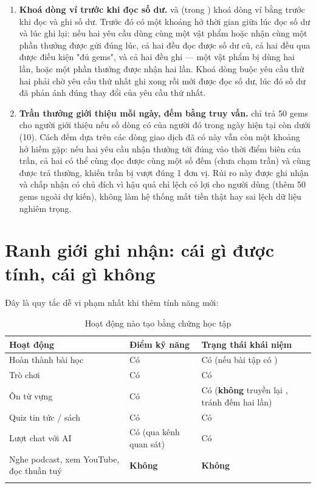 \begin{enumerate}[leftmargin=1.4em]
  \item \textbf{Khoá dòng ví trước khi đọc số dư.}  và 
  (trong ) khoá dòng ví bằng  trước khi đọc
  và ghi số dư. Trước đó có một khoảng hở thời gian giữa lúc đọc số dư và lúc ghi lại: nếu
  hai yêu cầu dùng cùng một vật phẩm hoặc nhận cùng một phần thưởng được gửi đúng lúc, cả
  hai đều đọc được số dư cũ, cả hai đều qua được điều kiện "đủ gems", và cả hai đều ghi —
  một vật phẩm bị dùng hai lần, hoặc một phần thưởng được nhận hai lần. Khoá dòng buộc yêu
  cầu thứ hai phải chờ yêu cầu thứ nhất ghi xong rồi mới được đọc số dư, lúc đó số dư đã
  phản ánh đúng thay đổi của yêu cầu thứ nhất.
  \item \textbf{Trần thưởng giới thiệu mỗi ngày, đếm bằng truy vấn.} 
  chỉ trả 50 gems cho người giới thiệu nếu số dòng  có
   của người đó trong ngày hiện tại còn dưới
   (10). Cách đếm dựa trên các dòng giao dịch đã
  có này vẫn còn một khoảng hở hiếm gặp: nếu hai yêu cầu nhận thưởng tới đúng vào thời điểm
  biên của trần, cả hai có thể cùng đọc được cùng một số đếm (chưa chạm trần) và cùng được
  trả thưởng, khiến trần bị vượt đúng 1 đơn vị. Rủi ro này được ghi nhận và chấp nhận có
  chủ đích vì hậu quả chỉ lệch có lợi cho người dùng (thêm 50 gems ngoài dự kiến), không
  làm hệ thống mất tiền thật hay sai lệch dữ liệu nghiêm trọng.
\end{enumerate}

\section{Ranh giới ghi nhận: cái gì được tính, cái gì không}

Đây là quy tắc dễ vi phạm nhất khi thêm tính năng mới:

\begin{longtable}{L{5.0cm} L{4.2cm} L{4.4cm}}
\toprule
\textbf{Hoạt động} & \textbf{Điểm kỹ năng} & \textbf{Trạng thái khái niệm}\\
\midrule
\endhead
Hoàn thành bài học & Có & Có (nếu bài tập có )\\
Trò chơi & Có & Có\\
Ôn từ vựng & Có & Có (\textbf{không} truyền lại , tránh đếm hai lần)\\
Quiz tin tức / sách & Có & Có\\
Lượt chat với AI & Có (qua kênh quan sát) & Có\\
Nghe podcast, xem YouTube, đọc thuần tuý & \textbf{Không} & \textbf{Không}\\
\bottomrule
\caption{Hoạt động nào tạo bằng chứng học tập}
\end{longtable}

